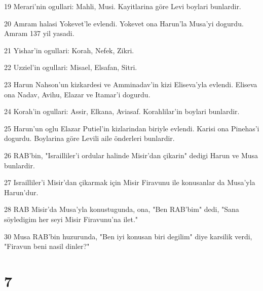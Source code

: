 \par 19 Merari'nin ogullari: Mahli, Musi. Kayitlarina göre Levi boylari bunlardir.
\par 20 Amram halasi Yokevet'le evlendi. Yokevet ona Harun'la Musa'yi dogurdu. Amram 137 yil yasadi.
\par 21 Yishar'in ogullari: Korah, Nefek, Zikri.
\par 22 Uzziel'in ogullari: Misael, Elsafan, Sitri.
\par 23 Harun Nahson'un kizkardesi ve Amminadav'in kizi Eliseva'yla evlendi. Eliseva ona Nadav, Avihu, Elazar ve Itamar'i dogurdu.
\par 24 Korah'in ogullari: Assir, Elkana, Aviasaf. Korahlilar'in boylari bunlardir.
\par 25 Harun'un oglu Elazar Putiel'in kizlarindan biriyle evlendi. Karisi ona Pinehas'i dogurdu. Boylarina göre Levili aile önderleri bunlardir.
\par 26 RAB'bin, "Israilliler'i ordular halinde Misir'dan çikarin" dedigi Harun ve Musa bunlardir.
\par 27 Israilliler'i Misir'dan çikarmak için Misir Firavunu ile konusanlar da Musa'yla Harun'dur.
\par 28 RAB Misir'da Musa'yla konustugunda, ona, "Ben RAB'bim" dedi, "Sana söyledigim her seyi Misir Firavunu'na ilet."
\par 30 Musa RAB'bin huzurunda, "Ben iyi konusan biri degilim" diye karsilik verdi, "Firavun beni nasil dinler?"

\chapter{7}

